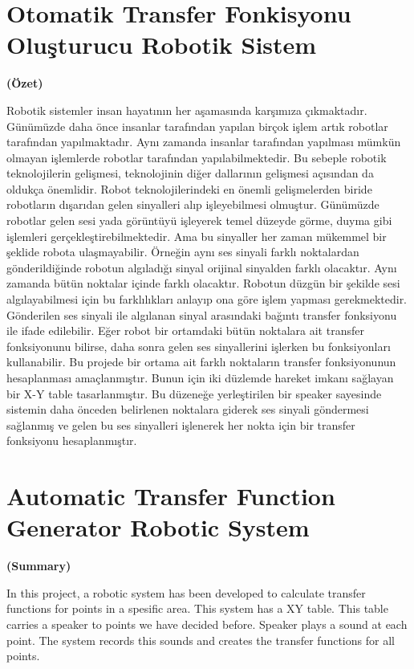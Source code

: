 \documentclass[a4paper, 12pt, titlepage]{article}
\begin{document}
\newpage
\section*{Otomatik Transfer Fonkisyonu Oluşturucu Robotik Sistem}
\centerline{\large\bfseries (Özet)}
Robotik sistemler insan hayatının her aşamasında karşımıza çıkmaktadır. Günümüzde daha önce insanlar tarafından yapılan birçok işlem artık robotlar tarafından yapılmaktadır. Aynı zamanda insanlar tarafından yapılması mümkün olmayan işlemlerde robotlar tarafından yapılabilmektedir. Bu sebeple robotik teknolojilerin gelişmesi, teknolojinin diğer dallarının gelişmesi açısından da oldukça önemlidir.
Robot teknolojilerindeki en önemli gelişmelerden biride robotların dışarıdan gelen sinyalleri alıp işleyebilmesi olmuştur. Günümüzde robotlar gelen sesi yada görüntüyü işleyerek temel düzeyde görme, duyma gibi işlemleri gerçekleştirebilmektedir. Ama bu sinyaller her zaman mükemmel bir şeklide robota ulaşmayabilir. Örneğin aynı ses sinyali farklı noktalardan gönderildiğinde robotun algıladığı sinyal orijinal sinyalden farklı olacaktır. Aynı zamanda bütün noktalar içinde farklı olacaktır. Robotun düzgün bir şekilde sesi algılayabilmesi için bu farklılıkları anlayıp ona göre işlem yapması gerekmektedir.
Gönderilen ses sinyali ile algılanan sinyal arasındaki bağıntı transfer fonksiyonu ile ifade edilebilir. Eğer robot bir ortamdaki bütün noktalara ait transfer fonksiyonunu bilirse, daha sonra gelen ses sinyallerini işlerken bu fonksiyonları kullanabilir. Bu projede bir ortama ait farklı noktaların transfer fonksiyonunun hesaplanması amaçlanmıştır.
Bunun için iki düzlemde hareket imkanı sağlayan bir X-Y table tasarlanmıştır. Bu düzeneğe yerleştirilen bir speaker sayesinde sistemin daha önceden belirlenen noktalara giderek ses sinyali göndermesi sağlanmış ve gelen bu ses sinyalleri işlenerek her nokta için bir transfer fonksiyonu hesaplanmıştır. 

\newpage
\section*{Automatic Transfer Function Generator Robotic System}
\centerline{\large\bfseries (Summary)}
In this project, a robotic system has been developed to calculate transfer functions for points in a spesific area. This system has a XY table. This table carries a speaker to points we have decided before. Speaker plays a sound at each point. The system records this sounds and creates the transfer functions for all points. 
\end{document}
